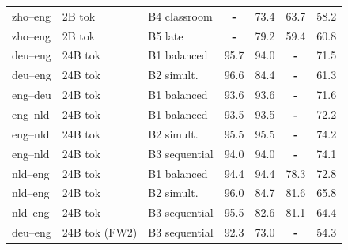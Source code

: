 \begin{table}[t]
\begin{tabular}{lll cc cc}
zho--eng & 2B tok & B4 classroom & \textbf{-} & \cellcolor[rgb]{0.872,1.000,0.872} 73.4 & \cellcolor[rgb]{0.903,1.000,0.903} 63.7 & \cellcolor[rgb]{0.932,1.000,0.932} 58.2 \\
zho--eng & 2B tok & B5 late & \textbf{-} & \cellcolor[rgb]{0.841,1.000,0.841} 79.2 & \cellcolor[rgb]{0.933,1.000,0.933} 59.4 & \cellcolor[rgb]{0.911,1.000,0.911} 60.8 \\
\midrule
deu--eng & 24B tok & B1 balanced & \cellcolor[rgb]{0.747,1.000,0.747} 95.7 & \cellcolor[rgb]{0.760,1.000,0.760} 94.0 & \textbf{-} & \cellcolor[rgb]{0.823,1.000,0.823} 71.5 \\
deu--eng & 24B tok & B2 simult. & \cellcolor[rgb]{0.742,1.000,0.742} 96.6 & \cellcolor[rgb]{0.812,1.000,0.812} 84.4 & \textbf{-} & \cellcolor[rgb]{0.907,1.000,0.907} 61.3 \\
eng--deu & 24B tok & B1 balanced & \cellcolor[rgb]{0.759,1.000,0.759} 93.6 & \cellcolor[rgb]{0.762,1.000,0.762} 93.6 & \textbf{-} & \cellcolor[rgb]{0.822,1.000,0.822} 71.6 \\
eng--nld & 24B tok & B1 balanced & \cellcolor[rgb]{0.759,1.000,0.759} 93.5 & \cellcolor[rgb]{0.763,1.000,0.763} 93.5 & \textbf{-} & \cellcolor[rgb]{0.817,1.000,0.817} 72.2 \\
eng--nld & 24B tok & B2 simult. & \cellcolor[rgb]{0.748,1.000,0.748} 95.5 & \cellcolor[rgb]{0.752,1.000,0.752} 95.5 & \textbf{-} & \cellcolor[rgb]{0.801,1.000,0.801} 74.2 \\
eng--nld & 24B tok & B3 sequential & \cellcolor[rgb]{0.757,1.000,0.757} 94.0 & \cellcolor[rgb]{0.760,1.000,0.760} 94.0 & \textbf{-} & \cellcolor[rgb]{0.802,1.000,0.802} 74.1 \\
nld--eng & 24B tok & B1 balanced & \cellcolor[rgb]{0.754,1.000,0.754} 94.4 & \cellcolor[rgb]{0.758,1.000,0.758} 94.4 & \cellcolor[rgb]{0.799,1.000,0.799} 78.3 & \cellcolor[rgb]{0.812,1.000,0.812} 72.8 \\
nld--eng & 24B tok & B2 simult. & \cellcolor[rgb]{0.745,1.000,0.745} 96.0 & \cellcolor[rgb]{0.811,1.000,0.811} 84.7 & \cellcolor[rgb]{0.775,1.000,0.775} 81.6 & \cellcolor[rgb]{0.870,1.000,0.870} 65.8 \\
nld--eng & 24B tok & B3 sequential & \cellcolor[rgb]{0.748,1.000,0.748} 95.5 & \cellcolor[rgb]{0.822,1.000,0.822} 82.6 & \cellcolor[rgb]{0.779,1.000,0.779} 81.1 & \cellcolor[rgb]{0.881,1.000,0.881} 64.4 \\
\midrule
deu--eng & 24B tok (FW2) & B3 sequential & \cellcolor[rgb]{0.766,1.000,0.766} 92.3 & \cellcolor[rgb]{0.875,1.000,0.875} 73.0 & \textbf{-} & \cellcolor[rgb]{0.965,1.000,0.965} 54.3 \\

\end{tabular}
\end{table}
